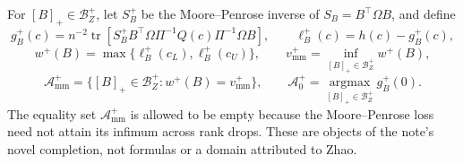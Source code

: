 For \([B]_+\in\mathcal B_Z^+\), let \(S_B^+\) be the Moore--Penrose inverse of \(S_B=B^{\top}\Omega B\), and define
\[
g_B^+(c)=n^{-2}\operatorname{tr}\!\left[S_B^+B^{\top}\Omega\Pi^{-1}Q(c)\Pi^{-1}\Omega B\right],
\qquad \ell_B^+(c)=h(c)-g_B^+(c),
\]
\[
w^+(B)=\max\{\ell_B^+(c_L),\ell_B^+(c_U)\},
\qquad v_{\mathrm{mm}}^+=\inf_{[B]_+\in\mathcal B_Z^+}w^+(B),
\]
\[
\mathcal A_{\mathrm{mm}}^+=\{[B]_+\in\mathcal B_Z^+:w^+(B)=v_{\mathrm{mm}}^+\},
\qquad \mathcal A_0^+=\operatorname*{argmax}_{[B]_+\in\mathcal B_Z^+}g_B^+(0).
\]
The equality set \(\mathcal A_{\mathrm{mm}}^+\) is allowed to be empty because the Moore--Penrose loss need not attain its infimum across rank drops.  These are objects of the note's novel completion, not formulas or a domain attributed to Zhao.